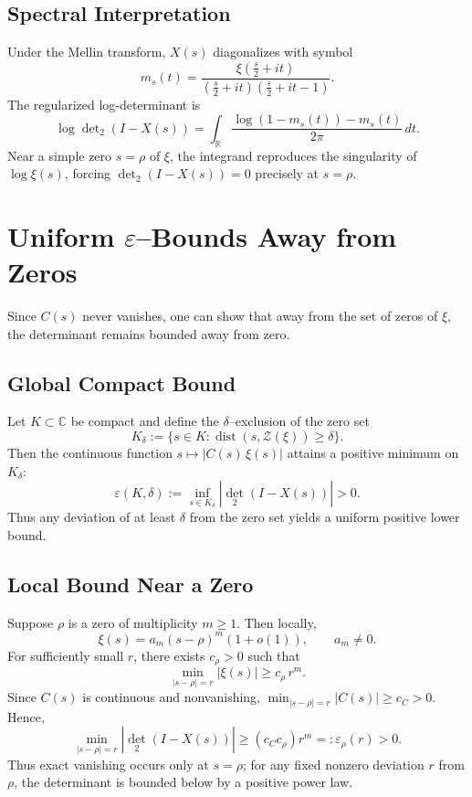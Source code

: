 \documentclass[12pt]{article}
\begin{document}
\subsection{Spectral Interpretation}
Under the Mellin transform, $X(s)$ diagonalizes with symbol
\begin{equation}
m_s(t) = \frac{\xi\left(\tfrac{s}{2}+it\right)}{\left(\tfrac{s}{2}+it\right)\left(\tfrac{s}{2}+it-1\right)}.
\end{equation}
The regularized log-determinant is
\begin{equation}
\log \det\nolimits_{2}(I - X(s)) = \int_{\mathbb{R}} \frac{\log(1-m_s(t)) - m_s(t)}{2\pi}\, dt.
\end{equation}
Near a simple zero $s=\rho$ of $\xi$, the integrand reproduces the singularity of $\log \xi(s)$, forcing $\det_2(I-X(s))=0$ precisely at $s=\rho$.

\section{Uniform $\varepsilon$--Bounds Away from Zeros}

Since $C(s)$ never vanishes, one can show that away from the set of zeros of $\xi$, the determinant remains bounded away from zero.

\subsection{Global Compact Bound}
Let $K\subset \mathbb{C}$ be compact and define the $\delta$--exclusion of the zero set
\begin{equation}
K_{\delta} := \{ s\in K : \operatorname{dist}(s, \mathcal{Z}(\xi)) \geq \delta \}.
\end{equation}
Then the continuous function $s \mapsto |C(s)\,\xi(s)|$ attains a positive minimum on $K_{\delta}$:
\begin{equation}
\varepsilon(K,\delta) := \inf_{s\in K_{\delta}} |\det_{2}(I - X(s))| > 0.
\end{equation}
Thus any deviation of at least $\delta$ from the zero set yields a uniform positive lower bound.

\subsection{Local Bound Near a Zero}
Suppose $\rho$ is a zero of multiplicity $m\geq 1$. Then locally,
\begin{equation}
\xi(s) = a_m (s-\rho)^m (1+o(1)), \qquad a_m\neq 0.
\end{equation}
For sufficiently small $r$, there exists $c_\rho>0$ such that
\begin{equation}
\min_{|s-\rho|=r} |\xi(s)| \geq c_\rho \, r^m.
\end{equation}
Since $C(s)$ is continuous and nonvanishing, $\min_{|s-\rho|=r}|C(s)|\geq c_C>0$. Hence,
\begin{equation}
\min_{|s-\rho|=r} |\det_{2}(I - X(s))| \geq (c_C c_\rho) r^m =: \varepsilon_\rho(r) > 0.
\end{equation}
Thus exact vanishing occurs only at $s=\rho$; for any fixed nonzero deviation $r$ from $\rho$, the determinant is bounded below by a positive power law.
\end{document}
